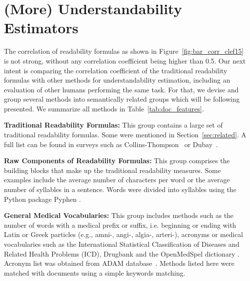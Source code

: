 

\section{(More) Understandability Estimators}
\label{sec:proxies}

The correlation of readability formulas as shown in Figure~\ref{fig:bar_corr_clef15} %
is not strong, without any correlation coefficient being higher than 0.5.
Our next intent is comparing the correlation coefficient of the traditional readability formulas with other methods for understandability estimation, including an evaluation of other humans performing the same task.
For that, we devise and group several methods into semantically related groups which will be following presented.
We summarize all methods in Table~\ref{tab:doc_features}.


\textbf{Traditional Readability Formulas:}
This group contains a large set of traditional readability formulas. Some were mentioned in Section~\ref{sec:related}. A full list can be found in surveys such as Collins-Thompson~\cite{collins2014computational} or Dubay~\cite{dubay04}.

\textbf{Raw Components of Readability Formulas:}
This group comprises the building blocks that make up the traditional readability measures. Some examples include the average number of characters per word or the average number of syllables in a sentence. Words were divided into syllables using the Python package Pyphen \cite{pyphen}.

\textbf{General Medical Vocabularies:}
This group includes methods such as the number of words with a medical prefix or suffix, i.e. beginning or ending with Latin or Greek particles (e.g., amni-, angi-, algia-, arteri-), acronyms or medical vocabularies such as the International Statistical Classification of Diseases and Related Health Problems (ICD), Drugbank and the OpenMedSpel dictionary \cite{openmedspel}.
Acronym list was obtained from ADAM database~\cite{zhou2006}. Methods listed here were matched with documents using a simple keywords matching.

